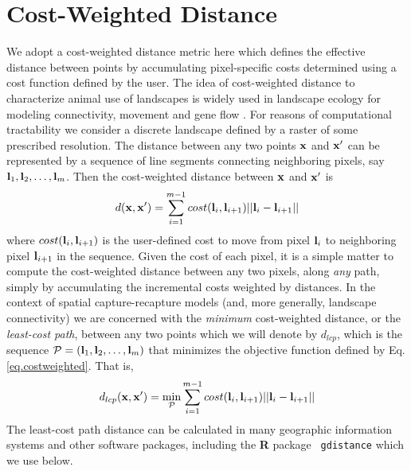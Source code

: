 \section{Cost-Weighted Distance}

We adopt a cost-weighted distance metric here which defines
the effective distance between points by accumulating pixel-specific costs
determined using a cost function defined by the user.  The idea of
cost-weighted distance to characterize animal use of landscapes is
widely used in landscape ecology for modeling connectivity, movement
and gene flow \citep{beier_etal:2008}. For reasons of
computational tractability we consider a discrete landscape
defined by
a raster of some prescribed resolution. The distance between any two
points ${\bf x}$ and ${\bf x}'$ can be represented by a sequence of
line segments connecting neighboring pixels, say ${\bf l}_{1},{\bf
  l}_{2},\ldots,{\bf l}_{m}$. Then the cost-weighted distance between
${\bf x}$ and ${\bf x}'$ is
\begin{equation}
 d({\bf x},{\bf x}')
  =  \sum_{i=1}^{m-1} cost({\bf l}_{i},{\bf l}_{i+1})||{\bf l}_{i} - {\bf l}_{i+1}||
\label{eq.costweighted}
\end{equation}
where $cost({\bf l}_{i},{\bf l}_{i+1})$ is the user-defined cost 
to move
from pixel ${\bf l}_{i}$ to neighboring pixel ${\bf l}_{i+1}$ in the sequence.
Given the cost of each pixel, it is a simple matter to compute the
cost-weighted distance between any two pixels, along {\it any} path,
simply by accumulating the incremental  costs weighted by
distances.
In the context of
spatial capture-recapture models (and, more generally, landscape
connectivity) we are concerned with the {\it minimum} cost-weighted
distance, or the {\it least-cost path}, between any two points which
we will denote by $d_{lcp}$, which is
the
sequence ${\cal P} = ({\bf l}_{1},{\bf l}_{2},\ldots,{\bf l}_{m})$ that minimizes
the objective function defined by Eq. \ref{eq.costweighted}. That is,
\begin{equation}
 d_{lcp}({\bf x},{\bf x}')
  =  \min_{{\cal P}} \sum_{i=1}^{m-1} cost({\bf l}_{i},{\bf l}_{i+1})||{\bf l}_{i} - {\bf l}_{i+1}||
\label{eq.lcp}
\end{equation}
The least-cost path distance can be calculated in
 many geographic information systems and other software packages,
including the {\bf R} package \mbox{\tt
  gdistance} \citep{vanetten:2011} which we use below.

